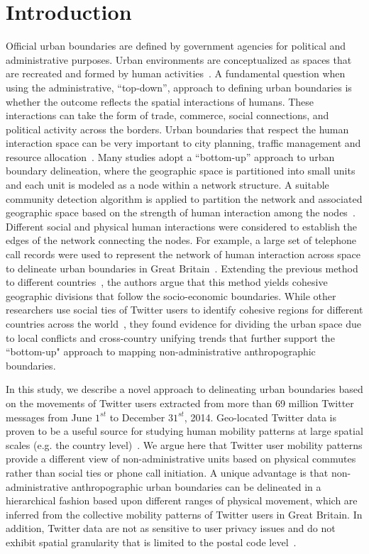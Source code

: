 \documentclass[]{tGIS2e}
\begin{document}
\section{Introduction}
Official urban boundaries are defined by government agencies for political and administrative purposes.
Urban environments are conceptualized as spaces that are recreated and formed by human activities~\citep{schliephake}.
A fundamental question when using the administrative, ``top-down'', approach to defining urban boundaries is whether the outcome reflects the spatial interactions of humans.
These interactions can take the form of trade, commerce, social connections, and political activity across the borders.
Urban boundaries that respect the human interaction space can be very important to city planning, traffic management and resource allocation~\citep{lynch1960,jiang2015,liu2015,long2015}.
Many studies adopt a ``bottom-up'' approach to urban boundary delineation, where the geographic space is partitioned into small units and each unit is modeled as a node within a network structure.
A suitable community detection algorithm is applied to partition the network and associated geographic space based on the strength of human interaction among the nodes~\citep{lancichinetti2009}.
Different social and physical human interactions were considered to establish the edges of the network connecting the nodes.
For example, a large set of telephone call records were used to represent the network of human interaction across space to delineate urban boundaries in Great Britain~\citep{ratti2010}.
Extending the previous method to different countries~\citep{sobolevsky2013}, the authors argue that this method yields cohesive geographic divisions that follow the socio-economic boundaries.
While other researchers use social ties of Twitter users to identify cohesive regions for different countries across the world~\citep{kallus2015}, they found evidence for dividing the urban space due to local conflicts and cross-country unifying trends that further support the ``bottom-up" approach to mapping non-administrative anthropographic boundaries.

In this study, we describe a novel approach to delineating urban boundaries based on the movements of 
Twitter users extracted from more than 69 million Twitter messages from June $1^{st}$ to December $31^{st}$, 2014.
Geo-located Twitter data is proven to be a useful source for studying human mobility patterns at large spatial scales (e.g. the country level)~\citep{hawelka,jurdak2015}.
We argue here that Twitter user mobility patterns provide a different view of non-administrative units based on physical commutes rather than social ties or phone call initiation. 
A unique advantage is that non-administrative anthropographic urban boundaries can be delineated in a hierarchical fashion based upon different ranges of physical movement, which are inferred from the collective mobility patterns of Twitter users in Great Britain. 
In addition, Twitter data are not as sensitive to user privacy issues and do not exhibit spatial granularity that is limited to the postal code level~\citep{thiemann}. 
\end{document}

